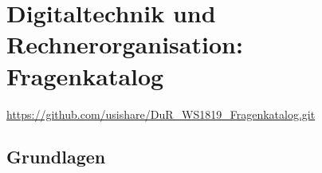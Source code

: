 \documentclass
[
  draft    = true,
  fontsize = 11pt,
  parskip  = half-,
  BCOR     = 0pt,
  DIV      = 11,
  ngerman,
  dvipsnames
]
{scrartcl}
\begin{document}

\section*{Digitaltechnik und Rechnerorganisation: Fragenkatalog}

\url{https://github.com/usishare/DuR_WS1819_Fragenkatalog.git}

\newsavebox{\tempbox}%

\subsection*{Grundlagen}
\end{document}
